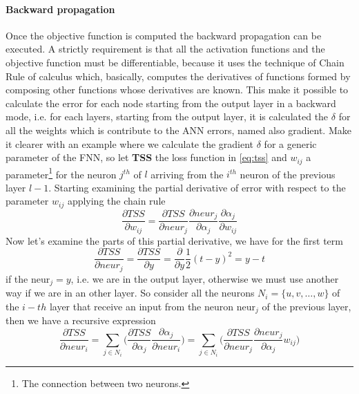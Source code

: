 \paragraph{Backward propagation}
Once the objective function is computed the backward propagation can be executed. A strictly requirement is that all the activation functions and the objective function must be differentiable, because it uses the technique of Chain Rule of calculus which, basically, computes the derivatives of functions formed by composing other functions whose derivatives are known.\newline\newline
This make it possible to calculate the error for each node starting from the output layer in a backward mode, i.e. for each layers, starting from the output layer, it is calculated the $\delta$ for all the weights which is contribute to the ANN errors, named also gradient. Make it clearer with an example where we calculate the gradient $\delta$ for a generic parameter of the FNN, so let \textbf{TSS} the loss function in \ref{eq:tss} and $w_{ij}$ a parameter\footnote{The connection between two neurons.} for the neuron $j^{th}$ of $l$ arriving from the $i^{th}$ neuron of the previous layer $l-1$. Starting examining the partial derivative of error with respect to the parameter $w_{ij}$ applying the chain rule
\begin{equation}
	\frac{\partial{TSS}}{\partial{w_{ij}}} = \frac{\partial{TSS}}{\partial{neur_j}}\frac{\partial{neur_j}}{\partial{\alpha_j}}\frac{\partial{\alpha_j}}{\partial{w_{ij}}}
\end{equation}\label{eq:partial-derivative-w_ij}
Now let's examine the parts of this partial derivative, we have for the first term
\begin{equation}
	\frac{\partial{TSS}}{\partial{neur_j}} = \frac{\partial{TSS}}{\partial{y}} = \frac{\partial{}}{\partial{y}}\frac{1}{2}(t - y)^2 = y - t
\end{equation}\label{eq:partial-derivative-output-layer}
if the $\textrm{neur}_j = y$, i.e. we are in the output layer, otherwise we must use another way if we are in an other layer. So consider all the neurons $N_i = \{u, v, \dots, w\}$ of the $i-th$ layer that receive an input from the neuron $\textrm{neur}_j$ of the previous layer, then we have a recursive expression
\begin{equation}
	\frac{\partial{TSS}}{\partial{neur_i}} = \sum\limits_{j \in N_i}\Bigg(\frac{\partial{TSS}}{\partial\alpha_j}\frac{\partial{\alpha_j}}{\partial{neur_i}}\Bigg) = \sum\limits_{j \in N_i}\Bigg(\frac{\partial{TSS}}{\partial{neur_j}}\frac{\partial{neur_j}}{\partial{\alpha_j}}w_{ij}\Bigg)
\end{equation}\label{eq:partial-derivative-inner-layer}
